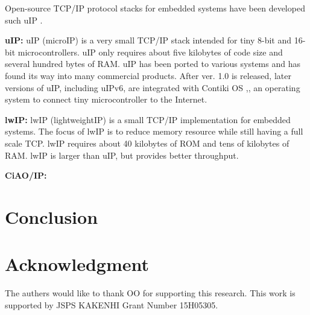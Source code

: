 \documentclass[conference]{IEEEtran/IEEEtran}
\begin{document}
Open-source TCP/IP protocol stacks for embedded systems have been developed such uIP \cite{par:uIP}.

{\bf uIP:}
uIP (microIP) is a very small TCP/IP stack intended for tiny 8-bit and 16-bit microcontrollers.
uIP only requires about five kilobytes of code size and several hundred bytes of RAM.
uIP has been ported to various systems and has found its way into many commercial products.
After ver. 1.0 is released, later versions of uIP, including uIPv6, are integrated with Contiki OS \cite{par:Contiki},\cite{url:Contiki}, an operating system to connect tiny microcontroller to the Internet.

{\bf lwIP:}
lwIP (lightweightIP) is a small TCP/IP implementation for embedded systems.
The focus of lwIP is to reduce memory resource while still having a full scale TCP.
lwIP requires about 40 kilobytes of ROM and tens of kilobytes of RAM.
lwIP is larger than uIP, but provides better throughput.

{\bf CiAO/IP:}


\section{Conclusion}
\label{sec:Conclusion}



\section*{Acknowledgment}

The authers would like to thank OO for supporting this research.
This work is supported by JSPS KAKENHI Grant Number 15H05305.





\end{document}

